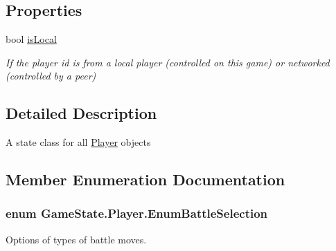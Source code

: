 \subsection*{Properties}
\begin{DoxyCompactItemize}
\item 
bool \hyperlink{class_game_state_1_1_player_affd7c601a6d763dafdc59a58c415e9e7}{is\-Local}
\begin{DoxyCompactList}\small\item\em If the player id is from a local player (controlled on this game) or networked (controlled by a peer) \end{DoxyCompactList}\end{DoxyCompactItemize}


\subsection{Detailed Description}
A state class for all \hyperlink{class_game_state_1_1_player}{Player} objects 



\subsection{Member Enumeration Documentation}
\hypertarget{class_game_state_1_1_player_a9f54c5eca1e60acbaa2074e981f51615}{
\subsubsection[{Enum\-Battle\-Selection}]{\setlength{\rightskip}{0pt plus 5cm}enum {\bf Game\-State.\-Player.\-Enum\-Battle\-Selection}}}\label{class_game_state_1_1_player_a9f54c5eca1e60acbaa2074e981f51615}


Options of types of battle moves. 



